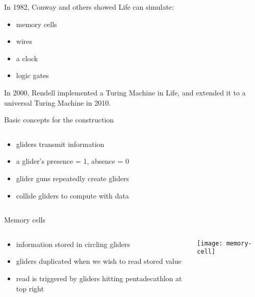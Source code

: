 \begin{frame}{}
  \begin{block}{}
	In 1982, Conway and others showed Life can simulate:
	\begin{itemize}
	\item memory cells
	\item wires
	\item a clock
	\item logic gates
	\end{itemize}
  \end{block}
  \begin{block}{}
	In 2000, Rendell implemented a Turing Machine in Life, and extended it to a
	universal Turing Machine in 2010.
  \end{block}
\end{frame}

\begin{frame}{Basic concepts for the construction}
  \begin{columns}
	\begin{column}{0.5\textwidth}
	  \begin{itemize}
	  \item gliders transmit information
	  \item a glider's presence = 1, absence = 0
	  \item glider guns repeatedly create gliders
	  \item collide gliders to compute with data
	  \end{itemize}
	\end{column}
	\begin{column}{0.49\textwidth}
	\end{column}
  \end{columns}
\end{frame}

\begin{frame}{Memory cells}
  \begin{columns}
	\begin{column}{0.5\textwidth}
	  \begin{itemize}
	  \item information stored in circling gliders
	  \item gliders duplicated when we wish to read stored value
	  \item read is triggered by gliders hitting pentadecathlon at top right
	  \end{itemize}
	\end{column}
	\begin{column}{0.5\textwidth}
	  \texttt{[image: memory-cell]}
	\end{column}
  \end{columns}
\end{frame}

